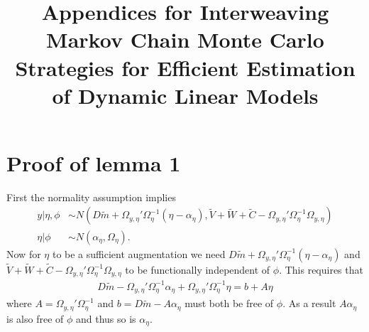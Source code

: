 \documentclass{article}
\begin{document}
\title{Appendices for Interweaving Markov Chain Monte Carlo Strategies for Efficient
Estimation of Dynamic Linear Models}
\maketitle
\appendix

\renewcommand\thefigure{\thesection.\arabic{figure}}    
\section{Proof of lemma 1}

First the normality assumption implies
\begin{align*}
  y|\eta,\phi &\sim N(D\tilde{m} + \Omega_{y,\eta}'\Omega_\eta^{-1}(\eta - \alpha_\eta), \tilde{V} + \tilde{W} + \tilde{C}- \Omega_{y,\eta}'\Omega_{\eta}^{-1}\Omega_{y,\eta})\\
  \eta|\phi &\sim N(\alpha_\eta, \Omega_\eta).
\end{align*}
Now for $\eta$ to be a sufficient augmentation we need $D\tilde{m} + \Omega_{y,\eta}'\Omega_\eta^{-1}(\eta - \alpha_\eta)$ and $\tilde{V} + \tilde{W} + \tilde{C} - \Omega_{y,\eta}'\Omega_{\eta}^{-1}\Omega_{y,\eta}$ to be functionally independent of $\phi$. This requires that
\begin{align*}
  D\tilde{m} - \Omega_{y,\eta}'\Omega_\eta^{-1}\alpha_\eta + \Omega_{y,\eta}'\Omega_\eta^{-1}\eta  = b + A\eta
\end{align*}
where $A=\Omega_{y,\eta}'\Omega_\eta^{-1}$ and $b=D\tilde{m} - A\alpha_\eta$ must both be free of $\phi$. As a result $A\alpha_\eta$ is also free of $\phi$ and thus so is $\alpha_{\eta}$.
\end{document}
